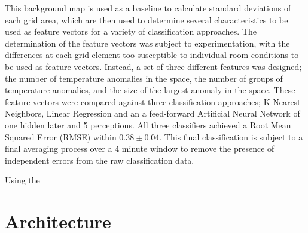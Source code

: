 \documentclass[../thesis/thesis.tex]{subfiles}
\begin{document}
This background map is used as a baseline to calculate standard deviations of each grid area, which are then used to determine several characteristics to be used as feature vectors for a variety of classification approaches. The determination of the feature vectors was subject to experimentation, with the differences at each grid element too susceptible to individual room conditions to be used as feature vectors. Instead, a set of three different features was designed; the number of temperature anomalies in the space, the number of groups of temperature anomalies, and the size of the largest anomaly in the space. These feature vectors were compared against three classification approaches; K-Nearest Neighbors, Linear Regression and an a feed-forward Artificial Neural Network of one hidden later and 5 perceptions. All three classifiers achieved a Root Mean Squared Error (RMSE) within $0.38\pm0.04$. This final classification is subject to a final averaging process over a 4 minute window to remove the presence of independent errors from the raw classification data.

Using the \mlx

\section{Architecture}
\label{sec:litreview:architecture}


\end{document}
